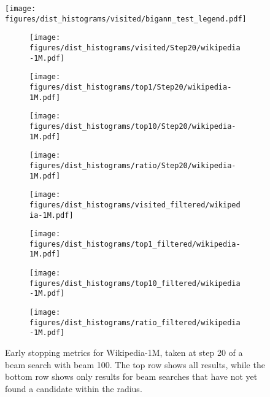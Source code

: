 \begin{figure*}
	\centering
	\texttt{[image: figures/dist\_histograms/visited/bigann\_test\_legend.pdf]} \\
	\begin{subfigure}{.24\textwidth}
		\texttt{[image: figures/dist\_histograms/visited/Step20/wikipedia-1M.pdf]}
	\end{subfigure}
	\begin{subfigure}{.24\textwidth}
		\texttt{[image: figures/dist\_histograms/top1/Step20/wikipedia-1M.pdf]}
	\end{subfigure}
	\begin{subfigure}{.24\textwidth}
		\texttt{[image: figures/dist\_histograms/top10/Step20/wikipedia-1M.pdf]}
	\end{subfigure}
	\begin{subfigure}{.24\textwidth}
		\texttt{[image: figures/dist\_histograms/ratio/Step20/wikipedia-1M.pdf]}
	\end{subfigure}
	\begin{subfigure}{.24\textwidth}
		\texttt{[image: figures/dist\_histograms/visited\_filtered/wikipedia-1M.pdf]}
	\end{subfigure}
	\begin{subfigure}{.24\textwidth}
		\texttt{[image: figures/dist\_histograms/top1\_filtered/wikipedia-1M.pdf]}
	\end{subfigure}
	\begin{subfigure}{.24\textwidth}
		\texttt{[image: figures/dist\_histograms/top10\_filtered/wikipedia-1M.pdf]}
	\end{subfigure}
	\begin{subfigure}{.24\textwidth}
		\texttt{[image: figures/dist\_histograms/ratio\_filtered/wikipedia-1M.pdf]}
	\end{subfigure}
	\caption{Early stopping metrics for Wikipedia-1M, taken at step 20 of a beam search with beam 100. The top row shows all results, while the bottom row shows only results for beam searches that have not yet found a candidate within the radius.}
	\label{fig:wikipedia_earlystop}
\end{figure*}


